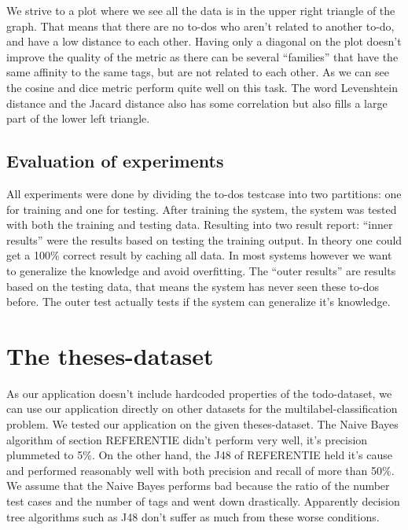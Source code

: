 \documentclass[a4paper,titlepage]{article}
\begin{document}
We strive to a plot where we see all the data is in the upper right triangle of the graph. That means that there are no to-dos who aren't related to another to-do, and have a low distance to each other. Having only a diagonal on the plot doesn't improve the quality of the metric as there can be several ``families'' that have the same affinity to the same tags, but are not related to each other. As we can see the cosine and dice metric perform quite well on this task. The word Levenshtein distance and the Jacard distance also has some correlation but also fills a large part of the lower left triangle.
\subsection{Evaluation of experiments}
All experiments were done by dividing the to-dos testcase into two partitions: one for training and one for testing. After training the system, the system was tested with both the training and testing data. Resulting into two result report: ``inner results'' were the results based on testing the training output. In theory one could get a 100\% correct result by caching all data. In most systems however we want to generalize the knowledge and avoid overfitting. The ``outer results'' are results based on the testing data, that means the system has never seen these to-dos before. The outer test actually tests if the system can generalize it's knowledge.

\section{The theses-dataset}
As our application doesn't include hardcoded properties of the todo-dataset, we can use our application directly on other datasets for the multilabel-classification problem. We tested our application on the given theses-dataset. The Naive Bayes algorithm of section REFERENTIE didn't perform very well, it's precision plummeted to 5\%. On the other hand, the J48 of REFERENTIE held it's cause and performed reasonably well with both precision and recall of more than 50\%. 
We assume that the Naive Bayes performs bad because the ratio of  the number test cases  and the number of tags and went down drastically. Apparently decision tree algorithms such as J48 don't suffer as much from these worse conditions. 
\end{document}
